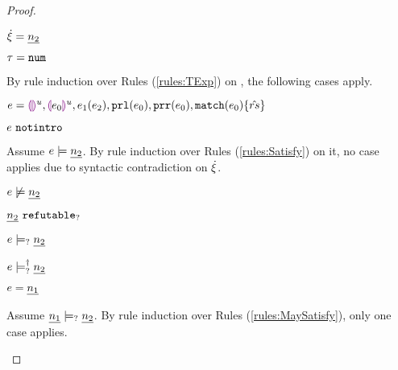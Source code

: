 \begin{proof}
\begin{byCases}
\item[\text{(\ref{rule:CTNum})}]
    \begin{pfsteps*}
    \item $\dot{\xi}=\underline{n_2}$ 
    \item $\tau=\mathtt{num}$ 
    \end{pfsteps*}
    By rule induction over Rules (\ref{rules:TExp}) on , the following cases apply.
    \begin{byCases}
    \item[\text{(\ref{rule:TEHole}),(\ref{rule:THole}),(\ref{rule:TAp}),(\ref{rule:TPrl}),(\ref{rule:TPrr}),(\ref{rule:TMatchZPre}),(\ref{rule:TMatchNZPre})}]
        \begin{pfsteps*}
        \item $e=\textcolor{violet}{\llparenthesis}\textcolor{violet}{\rrparenthesis}^{u},\textcolor{violet}{\llparenthesis} e_0\textcolor{violet}{\rrparenthesis}^{u},e_1(e_2),\mathtt{prl}(e_0),\mathtt{prr}(e_0),\mathtt{match}(e_0) \{\hat{rs}\}$ 
        \item $e ~\mathtt{notintro}$  
        \end{pfsteps*}
        Assume $e \models \underline{n_2}$. By rule induction over Rules (\ref{rules:Satisfy}) on it, no case applies due to syntactic contradiction on $\dot{\xi}$.\\
        \begin{pfsteps*}
        \item $e \not\models \underline{n_2}$ 
        \item $\underline{n_2} ~\mathtt{refutable}_?$  
        \item $e \models_{?} \underline{n_2}$  
        \item $e \models_{?}^{\dag} \underline{n_2}$  
        \end{pfsteps*}
    \item[\text{(\ref{rule:TNum})}]
        \begin{pfsteps*}
        \item $e=\underline{n_1}$ 
        \end{pfsteps*}
        Assume $\underline{n_1} \models_{?} \underline{n_2}$. By rule induction over Rules (\ref{rules:MaySatisfy}), only one case applies.
        \begin{byCases}

\end{byCases}
\end{byCases}
\end{byCases}
\end{proof}
